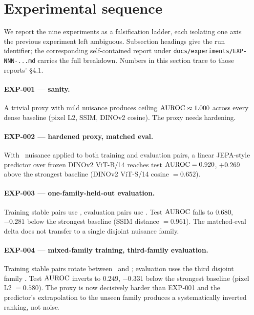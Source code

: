 \section{Experimental sequence}
\label{sec:experimental-sequence}

We report the nine experiments as a falsification ladder, each isolating one
axis the previous experiment left ambiguous. Subsection headings give the
run identifier; the corresponding self-contained report under
\texttt{docs/experiments/EXP-NNN-...md} carries the full breakdown. Numbers
in this section trace to those reports' \S4.1.

\paragraph{EXP-001 --- sanity.} A trivial proxy with mild nuisance produces
ceiling $\mathrm{AUROC} \approx 1.000$ across every dense baseline (pixel L2, SSIM,
DINOv2 cosine). The proxy needs hardening.

\paragraph{EXP-002 --- hardened proxy, matched eval.} With \strongfam\
nuisance applied to both training and evaluation pairs, a linear JEPA-style
predictor over frozen DINOv2 ViT-B/14 reaches test $\mathrm{AUROC} = 0.920$, $+0.269$
above the strongest baseline (DINOv2 ViT-S/14 cosine $= 0.652$).

\paragraph{EXP-003 --- one-family-held-out evaluation.} Training stable
pairs use \strongfam, evaluation pairs use \strongholdone. Test
$\mathrm{AUROC}$ falls to $0.680$, $-0.281$ below the strongest baseline (SSIM
distance $= 0.961$). The matched-eval delta does not transfer to a single
disjoint nuisance family.

\paragraph{EXP-004 --- mixed-family training, third-family evaluation.}
Training stable pairs rotate between \strongfam\ and \strongholdone;
evaluation uses the third disjoint family \strongholdtwo. Test $\mathrm{AUROC}$
inverts to $0.249$, $-0.331$ below the strongest baseline (pixel L2
$= 0.580$). The proxy is now decisively harder than EXP-001 and the
predictor's extrapolation to the unseen family produces a systematically
inverted ranking, not noise.

